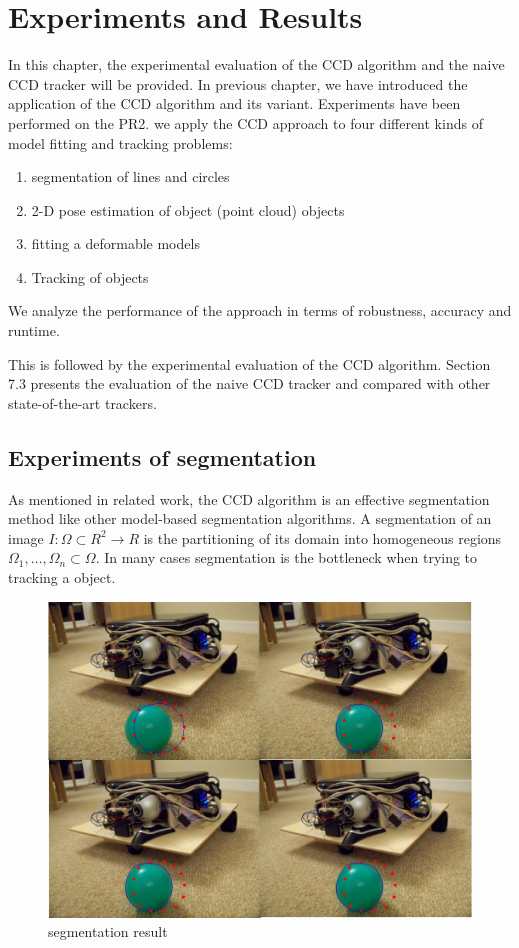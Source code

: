 \chapter{Experiments and Results}
\label{chapter:experiments}

In this chapter, the experimental evaluation of the CCD
algorithm and the naive CCD tracker will be provided. In previous
chapter, we have introduced the application of the CCD algorithm and
its variant. Experiments have been performed on the PR2. we apply the
CCD approach to four different kinds of model fitting and tracking problems:
\begin{enumerate}
\item segmentation of lines and circles
\item 2-D pose estimation of object (point cloud) objects
\item fitting a deformable models
\item Tracking of objects
\end{enumerate}
We analyze the performance of the approach in terms of robustness,
accuracy and runtime.

This is followed by the experimental
evaluation of the CCD algorithm. Section 7.3 presents the evaluation
of the naive CCD tracker and compared with other state-of-the-art
trackers.

\section{Experiments of segmentation}
\label{sec:ES}

As mentioned in related work, the CCD algorithm is an effective
segmentation method like other model-based segmentation algorithms.
A segmentation of an image $I: \Omega \subset R^2 \longrightarrow R$
is the partitioning of its domain into homogeneous regions
$\Omega_1,\ldots, \Omega_n \subset \Omega$. In many cases segmentation
is the bottleneck when trying to tracking a object.



\begin{figure}[htbp]
  \centering
\includegraphics[width=\linewidth]{images/segment1/segment1.png}
  \caption{segmentation result}
  \label{"waiting for reftex-label call..."}
\end{figure}

